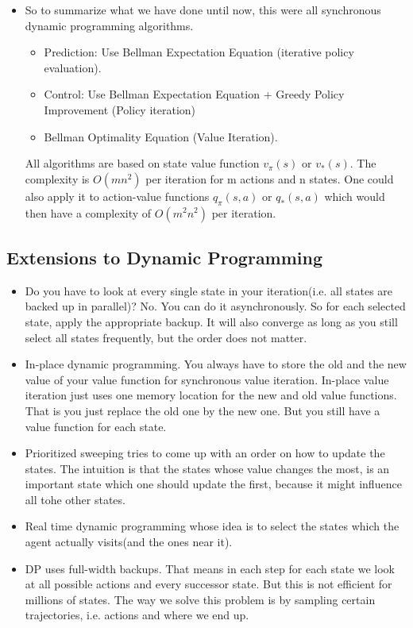 \documentclass[a4paper]{article}
\begin{document}
\begin{itemize}
    \item So to summarize what we have done until now, this were all synchronous dynamic programming algorithms. 
    \begin{itemize}
        \item Prediction: Use Bellman Expectation Equation (iterative policy evaluation). 
        \item Control: Use Bellman Expectation Equation + Greedy Policy Improvement (Policy iteration)
        \item Bellman Optimality Equation (Value Iteration). 
    \end{itemize}
    All algorithms are based on state value function $v_{\pi}(s)$ or $v_*(s)$. The complexity is $O(mn^2)$ per iteration for m actions and n states. One could also apply it to action-value functions $q_{\pi}(s,a)$ or $q_*(s,a)$ which would then have a complexity of $O(m^2n^2)$ per iteration. 
\end{itemize}
\subsection{Extensions to Dynamic Programming}
\begin{itemize}
    \item Do you have to look at every single state in your iteration(i.e. all states are backed up in parallel)? No. You can do it asynchronously. So for each selected state, apply the appropriate backup. It will also converge as long as you still select all states frequently, but the order does not matter. 
    \item In-place dynamic programming. You always have to store the old and the new value of your value function for synchronous value iteration. In-place value iteration just uses one memory location for the new and old value functions. That is you just replace the old one by the new one. But you still have a value function for each state. 
    \item Prioritized sweeping tries to come up with an order on how to update the states. The intuition is that the states whose value changes the most, is an important state which one should update the first, because it might influence all tohe other states. 
    \item Real time dynamic programming whose idea is to select the states which the agent actually visits(and the ones near it).
    \item DP uses full-width backups. That means in each step for each state we look at all possible actions and every successor state. But this is not efficient for millions of states. The way we solve this problem is by sampling certain trajectories, i.e. actions and where we end up. 
\end{itemize}
\end{document}
